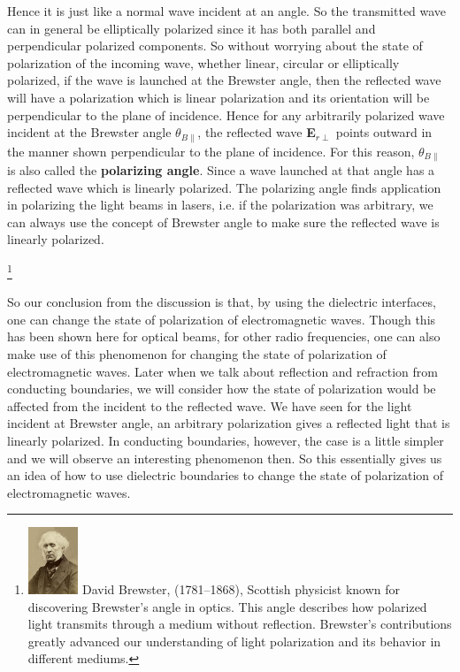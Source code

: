 Hence it is just like a normal wave incident at an angle. So the transmitted wave can in general be elliptically polarized since it has both parallel and perpendicular polarized components.
So without worrying about the state of polarization of the incoming wave, whether linear, circular or elliptically polarized, if the wave is launched at the Brewster angle, then the reflected wave will have a polarization which is linear polarization and its orientation will be perpendicular to the plane of incidence. Hence for any arbitrarily polarized wave incident at the Brewster angle $\theta_{B\parallel}$, the reflected wave \textbf{E}$_{r\perp}$ points outward in the manner shown perpendicular to the plane of incidence. For this reason, $\theta_{B\parallel}$ is also called the \textbf{polarizing angle}. Since a wave launched at that angle has a reflected wave which is linearly polarized. The polarizing angle finds application in polarizing the light beams in lasers, i.e. if the polarization was arbitrary, we can always use the concept of Brewster angle to make sure the reflected wave is linearly polarized. 

\footnote{
\includegraphics[height=20mm]{graphics/brewster}
David Brewster, (1781–1868), Scottish physicist known for discovering Brewster's angle in optics. This angle describes how polarized light transmits through a medium without reflection. Brewster's contributions greatly advanced our understanding of light polarization and its behavior in different mediums.
}

So our conclusion from the discussion is that, by using the dielectric interfaces, one can change the state of polarization of electromagnetic waves. Though this has been shown here for optical beams, for other radio frequencies, one can also make use of this phenomenon for changing the state of polarization of electromagnetic waves.
Later when we talk about reflection and refraction from conducting boundaries, we will consider how the state of polarization would be affected from the incident to the reflected wave.  We have seen for the light incident at Brewster angle, an arbitrary polarization gives a reflected light that is linearly polarized. In conducting boundaries, however, the case is a little simpler and we will observe an interesting phenomenon then. 
So this essentially gives us an idea of how to use dielectric boundaries to change the state of polarization of electromagnetic waves. 

